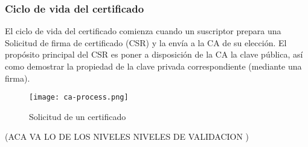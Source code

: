 \subsubsection*{Ciclo de vida del certificado}

El ciclo de vida del certificado comienza cuando un suscriptor prepara una 
Solicitud de firma de certificado (CSR) y la envía a la CA de su elección. 
El propósito principal del CSR es poner a disposición de la CA la clave 
pública, así como demostrar la propiedad de la clave privada correspondiente 
(mediante una firma). 


\begin{center}
    \begin{figure}   
       \begin{center}
          \texttt{[image: ca-process.png]}
       \end{center}
       \caption{Solicitud de un certificado}
       \label{figSolCert}
    \end{figure}
 \end{center}

(ACA VA LO DE LOS NIVELES NIVELES DE VALIDACION )
